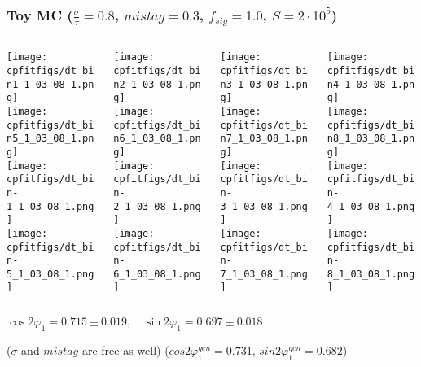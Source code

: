 \documentclass[10 pt,compress,mathserif]{beamer}
\begin{document}
\begin{frame}
 \frametitle{Toy MC ($\frac{\sigma}{\tau}=0.8$, $mistag = 0.3$, $f_{sig} = 1.0$, $S = 2\cdot10^5$)}
 \begin{columns}
  \begin{column}{0.25\textwidth}
   \texttt{[image: cpfitfigs/dt\_bin1\_1\_03\_08\_1.png]}\\
   \texttt{[image: cpfitfigs/dt\_bin5\_1\_03\_08\_1.png]}\\
   \texttt{[image: cpfitfigs/dt\_bin-1\_1\_03\_08\_1.png]}\\
   \texttt{[image: cpfitfigs/dt\_bin-5\_1\_03\_08\_1.png]}
  \end{column}
  \begin{column}{0.25\textwidth}
   \texttt{[image: cpfitfigs/dt\_bin2\_1\_03\_08\_1.png]}\\
   \texttt{[image: cpfitfigs/dt\_bin6\_1\_03\_08\_1.png]}\\
   \texttt{[image: cpfitfigs/dt\_bin-2\_1\_03\_08\_1.png]}\\
   \texttt{[image: cpfitfigs/dt\_bin-6\_1\_03\_08\_1.png]}
  \end{column}
  \begin{column}{0.25\textwidth}
   \texttt{[image: cpfitfigs/dt\_bin3\_1\_03\_08\_1.png]}\\
   \texttt{[image: cpfitfigs/dt\_bin7\_1\_03\_08\_1.png]}\\
   \texttt{[image: cpfitfigs/dt\_bin-3\_1\_03\_08\_1.png]}\\
   \texttt{[image: cpfitfigs/dt\_bin-7\_1\_03\_08\_1.png]}
  \end{column}
  \begin{column}{0.25\textwidth}
   \texttt{[image: cpfitfigs/dt\_bin4\_1\_03\_08\_1.png]}\\
   \texttt{[image: cpfitfigs/dt\_bin8\_1\_03\_08\_1.png]}\\
   \texttt{[image: cpfitfigs/dt\_bin-4\_1\_03\_08\_1.png]}\\
   \texttt{[image: cpfitfigs/dt\_bin-8\_1\_03\_08\_1.png]}
  \end{column}
 \end{columns}
 \begin{center}
  $\cos{2\varphi_1} = 0.715 \pm 0.019,\quad \sin{2\varphi_1} = 0.697 \pm 0.018$
  
  ($\sigma$ and $mistag$ are free as well)  ($cos2\varphi^{gen}_1 = 0.731$, $sin2\varphi^{gen}_1 = 0.682$)
 \end{center}
\end{frame}
\end{document}
